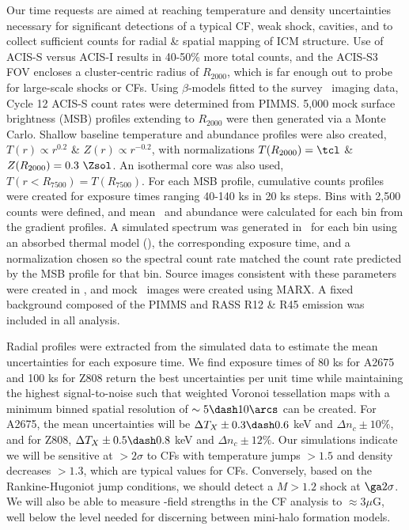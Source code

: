 \documentclass[letterpaper,11pt]{article}
\begin{document}
 Our time requests are aimed
at reaching temperature and density uncertainties necessary for
significant detections of a typical CF, weak shock, cavities, and to
collect sufficient counts for radial \& spatial mapping of ICM
structure. Use of ACIS-S versus ACIS-I results in 40-50\% more total
counts, and the ACIS-S3 FOV encloses a cluster-centric radius of
$R_{2000}$, which is far enough out to probe for large-scale shocks or
CFs. Using $\beta$-models fitted to the survey \rosat\ imaging data,
Cycle 12 ACIS-S count rates were determined from PIMMS. 5,000 mock
surface brightness (MSB) profiles extending to $R_{2000}$ were then
generated via a Monte Carlo. Shallow baseline temperature and
abundance profiles were also created, $T(r) \propto r^{0.2}$ \& $Z(r)
\propto r^{-0.2}$, with normalizations $T(R_{2000}) = \tcl$ \&
$Z(R_{2000}) = 0.3 ~\Zsol$. An isothermal core was also used,
$T(r<R_{7500}) = T(R_{7500})$. For each MSB profile, cumulative counts
profiles were created for exposure times ranging 40-140 ks in 20 ks
steps. Bins with 2,500 counts were defined, and mean \tx\ and
abundance were calculated for each bin from the gradient profiles. A
simulated spectrum was generated in \xspec\ for each bin using an
absorbed thermal model (\mekal), the corresponding exposure time, and
a normalization chosen so the spectral count rate matched the count
rate predicted by the MSB profile for that bin. Source images
consistent with these parameters were created in \idl, and mock
\chandra\ images were created using MARX. A fixed background composed
of the PIMMS and RASS R12 \& R45 emission was included in all
analysis.

Radial profiles were extracted from the simulated data to estimate the
mean uncertainties for each exposure time. We find exposure times of
80 ks for A2675 and 100 ks for Z808 return the best uncertainties per
unit time while maintaining the highest signal-to-noise such that
weighted Voronoi tessellation maps with a minimum binned spatial
resolution of $\sim 5 \dash 10\arcs$ can be created. For A2675, the
mean uncertainties will be $\Delta T_X \pm 0.3 \dash 0.6$ keV and
$\Delta n_c \pm 10\%$, and for Z808, $\Delta T_X \pm 0.5 \dash 0.8$
keV and $\Delta n_c \pm 12\%$. Our simulations indicate we will be
sensitive at $> 2\sigma$ to CFs with temperature jumps $> 1.5$ and
density decreases $> 1.3$, which are typical values for
CFs. Conversely, based on the Rankine-Hugoniot jump conditions, we
should detect a $M > 1.2$ shock at $\ga 2\sigma$. We will also be able
to measure \bmag-field strengths in the CF analysis to $\approx
3\mu$G, well below the level needed for discerning between mini-halo
formation models.
\end{document}
